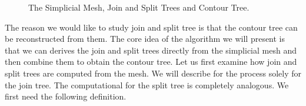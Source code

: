 \begin{figure}[h]
    \caption{The Simplicial Mesh, Join and Split Trees and Contour Tree.}%
    \label{fig:mesh-join-split-contour}%
\end{figure}

The reason we would like to study join and split tree is that the contour tree can be reconstructed from them. The core idea of the algorithm we will present is that we can derives the join and split trees directly from the simplicial mesh and then combine them to obtain the contour tree. Let us first examine how join and split trees are computed from the mesh. We will describe for the process solely for the join tree. The computational for the split tree is completely analogous.  We first need the following definition.

